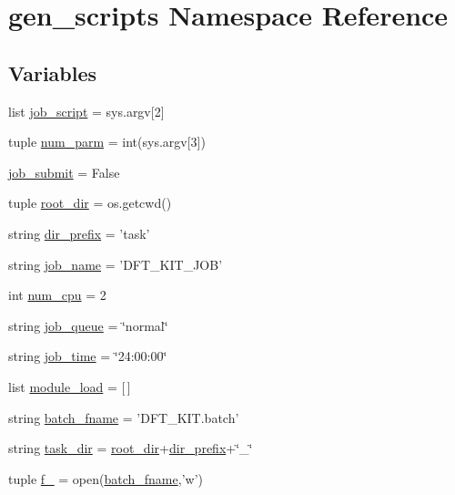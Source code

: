 \hypertarget{namespacegen__scripts}{\section{gen\+\_\+scripts Namespace Reference}
\label{namespacegen__scripts}
}
\subsection*{Variables}
\begin{DoxyCompactItemize}
\item 
list \hyperlink{namespacegen__scripts_a12678ff7a3d593bd7cf47174be709f45}{job\+\_\+script} = sys.\+argv\mbox{[}2\mbox{]}
\item 
tuple \hyperlink{namespacegen__scripts_a8dd8aed0ec29ea5536f01d06f00ab25a}{num\+\_\+parm} = int(sys.\+argv\mbox{[}3\mbox{]})
\item 
\hyperlink{namespacegen__scripts_a2a14c2baae124bbad677a6ad3ce1a30c}{job\+\_\+submit} = False
\item 
tuple \hyperlink{namespacegen__scripts_a4107e1299924aa1379f5609bbd7adb0a}{root\+\_\+dir} = os.\+getcwd()
\item 
string \hyperlink{namespacegen__scripts_a15f71844ccbc98f6a1f91347455f7d87}{dir\+\_\+prefix} = 'task'
\item 
string \hyperlink{namespacegen__scripts_a906734da531d3026197844cbba1dab23}{job\+\_\+name} = 'D\+F\+T\+\_\+\+K\+I\+T\+\_\+\+J\+O\+B'
\item 
int \hyperlink{namespacegen__scripts_a92e23c6e77ee514b72104bc4c77e67b5}{num\+\_\+cpu} = 2
\item 
string \hyperlink{namespacegen__scripts_a1dbb111ede2a7f1c6b488fe346fb728c}{job\+\_\+queue} = \char`\"{}normal\char`\"{}
\item 
string \hyperlink{namespacegen__scripts_a1ef862b04e26c1258b9278e3cf1f80b3}{job\+\_\+time} = \char`\"{}24\+:00\+:00\char`\"{}
\item 
list \hyperlink{namespacegen__scripts_ae30417a9c55d0f80fb830d0b2b905746}{module\+\_\+load} = \mbox{[}$\,$\mbox{]}
\item 
string \hyperlink{namespacegen__scripts_aaaae961ae3447d960ad9f06336b3f97d}{batch\+\_\+fname} = 'D\+F\+T\+\_\+\+K\+I\+T.\+batch'
\item 
string \hyperlink{namespacegen__scripts_a47a040de28afdc7e4ddac88b19d0a879}{task\+\_\+dir} = \hyperlink{namespacegen__scripts_a4107e1299924aa1379f5609bbd7adb0a}{root\+\_\+dir}+\hyperlink{namespacegen__scripts_a15f71844ccbc98f6a1f91347455f7d87}{dir\+\_\+prefix}+\char`\"{}\+\_\+\char`\"{}
\item 
tuple \hyperlink{namespacegen__scripts_a895fcc1e9240e322fa357b01cf1a0c8c}{f\+\_\+} = open(\hyperlink{namespacegen__scripts_aaaae961ae3447d960ad9f06336b3f97d}{batch\+\_\+fname},'w')
\end{DoxyCompactItemize}


